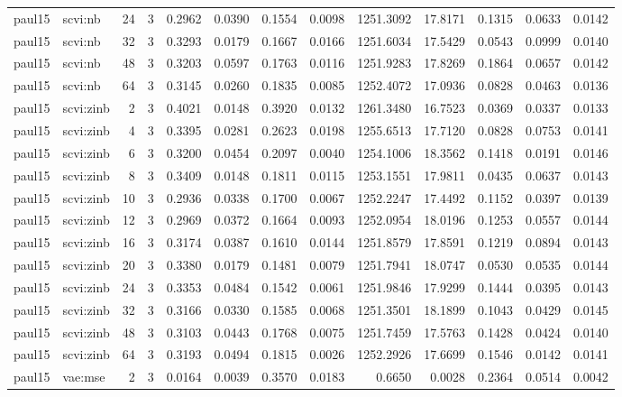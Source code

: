 \begin{tabular}{llrrrrrrrrrrr}
paul15 & scvi:nb & 24 & 3 & 0.2962 & 0.0390 & 0.1554 & 0.0098 & 1251.3092 & 17.8171 & 0.1315 & 0.0633 & 0.0142 \\
paul15 & scvi:nb & 32 & 3 & 0.3293 & 0.0179 & 0.1667 & 0.0166 & 1251.6034 & 17.5429 & 0.0543 & 0.0999 & 0.0140 \\
paul15 & scvi:nb & 48 & 3 & 0.3203 & 0.0597 & 0.1763 & 0.0116 & 1251.9283 & 17.8269 & 0.1864 & 0.0657 & 0.0142 \\
paul15 & scvi:nb & 64 & 3 & 0.3145 & 0.0260 & 0.1835 & 0.0085 & 1252.4072 & 17.0936 & 0.0828 & 0.0463 & 0.0136 \\
paul15 & scvi:zinb & 2 & 3 & 0.4021 & 0.0148 & 0.3920 & 0.0132 & 1261.3480 & 16.7523 & 0.0369 & 0.0337 & 0.0133 \\
paul15 & scvi:zinb & 4 & 3 & 0.3395 & 0.0281 & 0.2623 & 0.0198 & 1255.6513 & 17.7120 & 0.0828 & 0.0753 & 0.0141 \\
paul15 & scvi:zinb & 6 & 3 & 0.3200 & 0.0454 & 0.2097 & 0.0040 & 1254.1006 & 18.3562 & 0.1418 & 0.0191 & 0.0146 \\
paul15 & scvi:zinb & 8 & 3 & 0.3409 & 0.0148 & 0.1811 & 0.0115 & 1253.1551 & 17.9811 & 0.0435 & 0.0637 & 0.0143 \\
paul15 & scvi:zinb & 10 & 3 & 0.2936 & 0.0338 & 0.1700 & 0.0067 & 1252.2247 & 17.4492 & 0.1152 & 0.0397 & 0.0139 \\
paul15 & scvi:zinb & 12 & 3 & 0.2969 & 0.0372 & 0.1664 & 0.0093 & 1252.0954 & 18.0196 & 0.1253 & 0.0557 & 0.0144 \\
paul15 & scvi:zinb & 16 & 3 & 0.3174 & 0.0387 & 0.1610 & 0.0144 & 1251.8579 & 17.8591 & 0.1219 & 0.0894 & 0.0143 \\
paul15 & scvi:zinb & 20 & 3 & 0.3380 & 0.0179 & 0.1481 & 0.0079 & 1251.7941 & 18.0747 & 0.0530 & 0.0535 & 0.0144 \\
paul15 & scvi:zinb & 24 & 3 & 0.3353 & 0.0484 & 0.1542 & 0.0061 & 1251.9846 & 17.9299 & 0.1444 & 0.0395 & 0.0143 \\
paul15 & scvi:zinb & 32 & 3 & 0.3166 & 0.0330 & 0.1585 & 0.0068 & 1251.3501 & 18.1899 & 0.1043 & 0.0429 & 0.0145 \\
paul15 & scvi:zinb & 48 & 3 & 0.3103 & 0.0443 & 0.1768 & 0.0075 & 1251.7459 & 17.5763 & 0.1428 & 0.0424 & 0.0140 \\
paul15 & scvi:zinb & 64 & 3 & 0.3193 & 0.0494 & 0.1815 & 0.0026 & 1252.2926 & 17.6699 & 0.1546 & 0.0142 & 0.0141 \\
paul15 & vae:mse & 2 & 3 & 0.0164 & 0.0039 & 0.3570 & 0.0183 & 0.6650 & 0.0028 & 0.2364 & 0.0514 & 0.0042 \\

\end{tabular}

